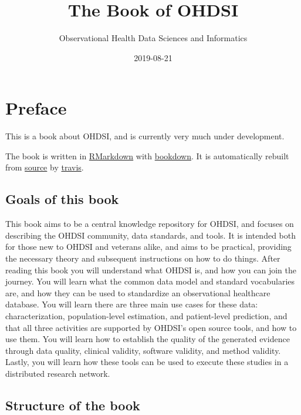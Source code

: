 \documentclass[11pt]{book}
\title{The Book of OHDSI}
\author{Observational Health Data Sciences and Informatics}
\date{2019-08-21}
\theoremstyle{definition}
\theoremstyle{definition}
\theoremstyle{definition}
\theoremstyle{remark}
\begin{document}
\maketitle

{
\setcounter{tocdepth}{1}
\tableofcontents
}
\hypertarget{preface}{%
\chapter*{Preface}\label{preface}}

This is a book about OHDSI, and is currently very much under development.

The book is written in \href{https://rmarkdown.rstudio.com}{RMarkdown} with \href{https://bookdown.org}{bookdown}. It is automatically rebuilt from \href{https://github.com/OHDSI/TheBookOfOhdsi}{source} by \href{http://travis-ci.org/}{travis}.

\hypertarget{goals-of-this-book}{%
\section*{Goals of this book}\label{goals-of-this-book}}

This book aims to be a central knowledge repository for OHDSI, and focuses on describing the OHDSI community, data standards, and tools. It is intended both for those new to OHDSI and veterans alike, and aims to be practical, providing the necessary theory and subsequent instructions on how to do things. After reading this book you will understand what OHDSI is, and how you can join the journey. You will learn what the common data model and standard vocabularies are, and how they can be used to standardize an observational healthcare database. You will learn there are three main use cases for these data: characterization, population-level estimation, and patient-level prediction, and that all three activities are supported by OHDSI's open source tools, and how to use them. You will learn how to establish the quality of the generated evidence through data quality, clinical validity, software validity, and method validity. Lastly, you will learn how these tools can be used to execute these studies in a distributed research network.

\hypertarget{structure-of-the-book}{%
\section*{Structure of the book}\label{structure-of-the-book}}
\end{document}
